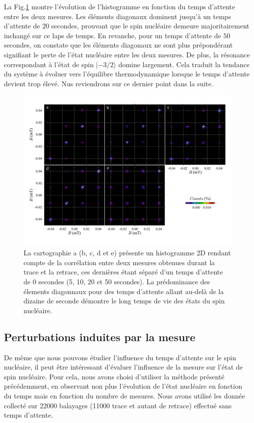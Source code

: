 La Fig.\ref{evolution_temps} montre l'évolution de l'histogramme en fonction du temps d'attente entre les deux mesures. Les éléments diagonaux dominent jusqu'à un temps d'attente de $20$ secondes, prouvant que le spin nucléaire demeure majoritairement inchangé sur ce laps de temps. En revanche, pour un temps d'attente de $50$ secondes, on constate que les éléments diagonaux ne sont plus prépondérant signifiant le perte de l'état nucléaire entre les deux mesures. De plus, la résonance correspondant à l'état de spin $|-3/2 \rangle$ domine largement. Cela traduit la tendance du système à évoluer vers l'équilibre thermodynamique lorsque le temps d'attente devient trop élevé. Nus reviendrons sur ce dernier point dans la suite.

\begin{figure}[h]
\includegraphics[scale=0.45]{Resultats/Chap2/Figure2/figure2.pdf} 
\caption{La cartographie a (b, c, d et e) présente un histogramme 2D rendant compte de la corrélation entre deux mesures obtenues durant la trace et la retrace, ces dernières étant séparé d'un temps d'attente de 0 secondes (5, 10, 20 et 50 secondes). La prédominance des élements diagonnaux pour des temps d'attente allant au-delà de la dizaine de seconde démontre le long temps de vie des états du spin nucléaire.}
\label{evolution_temps}
\end{figure}


\subsection{Perturbations induites par la mesure}
De m\^eme que nous pouvons étudier l'influence du temps d'attente sur le spin nucléaire, il peut \^etre intéressant d'évaluer l'influence de la mesure sur l'état de spin nucléaire. Pour cela, nous avons choisi d'utiliser la méthode présenté précédemment, en observant non plus l'évolution de l'état nucléaire en fonction du temps mais en fonction du nombre de mesures. Nous avons utilisé les donnée collecté sur 22000 balayages (11000 trace et autant de retrace) effectué sans temps d'attente.

